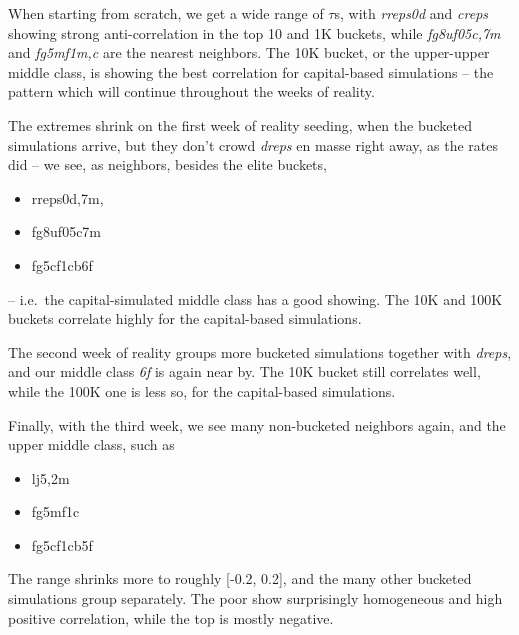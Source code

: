 \documentclass[10pt,oneside]{memoir}
\begin{document}
\begin{Spacing}{2}
When starting from scratch, we get a wide range of $\tau$s, with {\itshape rreps0d} and {\itshape creps} showing strong anti-correlation in the top 10 and 1K buckets, while {\itshape fg8uf05c{,7m}} and {\itshape fg5mf1{m,c}} are the nearest neighbors.  The 10K bucket, or the upper-upper middle class, is showing the best correlation for capital-based simulations -- the pattern which will continue throughout the weeks of reality.


The extremes shrink on the first week of reality seeding, when the bucketed simulations arrive, but they don't crowd {\itshape dreps} en masse right away, as the rates did -- we see, as neighbors, besides the elite buckets, 


\begin{itemize}


\item rreps{0d,7m,}

\item fg8uf05c7m

\item fg5cf1cb6f
\end{itemize}

-- i.e.\ the capital-simulated middle class has a good showing.  The 10K and 100K buckets correlate highly for the capital-based simulations.


The second week of reality groups more bucketed simulations together with {\itshape dreps}, and our middle class {\itshape 6f} is again near by.  The 10K bucket still correlates well, while the 100K one is less so, for the capital-based simulations.


Finally, with the third week, we see many non-bucketed neighbors again, and the upper middle class, such as 


\begin{itemize}


\item lj{5,2}m

\item fg5mf1c

\item fg5cf1cb5f
\end{itemize}

The range shrinks more to roughly [-0.2, 0.2], and the many other bucketed simulations group separately.  The poor show surprisingly homogeneous and high positive correlation, while the top is mostly negative.




\end{Spacing}
\end{document}

